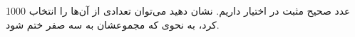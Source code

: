 \exercise

1000
عدد صحیح مثبت در اختیار داریم.
نشان دهید می‌توان تعدادی از آن‌ها را انتخاب کرد،
به نحوی که مجموعشان به سه صفر ختم شود.
